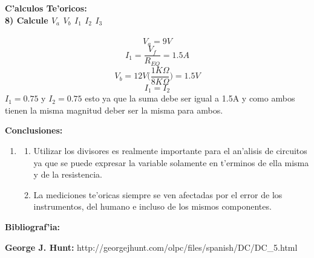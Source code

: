 \documentclass[11pt, letterpaper]{report}
\newenvironment{enumTab}{\begin{enumerate}[label=]\item \begin{enumerate}[label=$\bullet$]}{\end{enumerate}\end{enumerate}} %
\newenvironment{block}[1]{\hspace{-0.8 cm}\textbf{\Large #1}}{\vspace{3 mm}} %
\newenvironment{question}[2]{\hspace{-0.8 cm}\textbf{#1) #2\\\\}}{\vspace{3 mm}} %
\newcommand{\bib}[2]{ \textbf{\large #1:} \small #2\\} %
\begin{document}
\begin{block}{C'alculos Te'oricos:\\}
	\begin{question}{8}{Calcule  \(V_a\) \(V_b\) \(I_1\) \(I_2\) \(I_3\)}
	\[V_a = 9V\]
	\[I_1 = \frac{V_f}{R_{EQ}}=1.5A\]
	\[V_b = 12V\bigl(\frac{1K\Omega}{8K\Omega}\bigr)=1.5V\]
	\[I_1=I_2\]
	\hfill\(I_1 = 0.75\) y \(I_2 = 0.75\) esto ya que la suma debe ser igual a 1.5A y como ambos tienen la misma magnitud deber ser la misma para ambos.\hspace*{\fill}
	\end{question}
	\end{block}
			
	\vspace{3 mm}
	\begin{block}{Conclusiones:}
	\begin{enumTab}
	\item Utilizar los divisores es realmente importante para el an'alisis de circuitos ya que se puede expresar la variable solamente en t'erminos de ella misma y de la resistencia.
	\item La mediciones te'oricas siempre se ven afectadas por el error de los instrumentos, del humano e incluso de los mismos componentes.
	\end{enumTab}
	\end{block}
		
	\begin{block}{Bibliograf'ia:}
	
		\bib{George J. Hunt}{http://georgejhunt.com/olpc/files/spanish/DC/DC\_5.html}
	\end{block}
		
\end{document}
